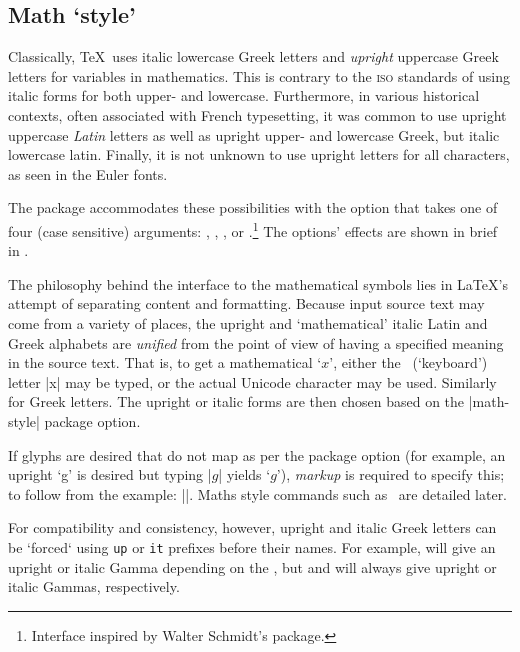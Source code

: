 \subsection{Math `style'}

Classically, \TeX\ uses italic lowercase Greek letters and \emph{upright}
uppercase Greek letters for variables in mathematics. This is contrary to
the \textsc{iso} standards of using italic forms for both upper- and lowercase.
Furthermore, in various historical contexts, often associated with French typesetting, it was common to use upright uppercase \emph{Latin} letters as well as upright
upper- and lowercase Greek, but italic lowercase latin. Finally, it is not unknown to use upright letters
for all characters, as seen in the Euler fonts.

The  package accommodates these possibilities with the
option  that takes one of four (case sensitive) arguments:
, , , or .\footnote{Interface inspired by Walter Schmidt's  package.}
The  options' effects are shown in brief in .

The philosophy behind the interface to the mathematical symbols
lies in \LaTeX's attempt of separating content and formatting. Because input
source text may come from a variety of places, the upright and
`mathematical' italic Latin and Greek alphabets are \emph{unified} from the
point of view of having a specified meaning in the source text. That is, to
get a mathematical ‘$x$’, either the \ascii\ (`keyboard') letter |x| may
be typed, or the actual Unicode character may be used. Similarly for Greek
letters. The upright or italic forms are then chosen based on the
|math-style| package option.

If glyphs are desired that do not map as per the package option (for
example, an upright `g' is desired but typing |$g$| yields `$g$'),
\emph{markup} is required to specify this; to follow from the example:
||.
Maths style commands such as \cmd\symup\ are detailed later.

For compatibility and consistency, however, upright and italic Greek letters
can be `forced` using \verb|up| or \verb|it| prefixes before their names.
For example,  will give an upright or italic Gamma depending on the
, but  and  will always give upright
or italic Gammas, respectively.

